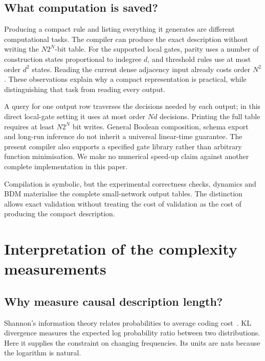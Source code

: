 \documentclass[11pt,a4paper]{article}
\begin{document}
\subsection{What computation is saved?}
Producing a compact rule and listing everything it generates are different
computational tasks. The compiler can produce the exact description without writing the
$N2^N$-bit table. For the supported local gates, parity uses a number of
construction states proportional to indegree $d$, and threshold rules use
at most order $d^2$ states. Reading the current dense adjacency input
already costs order $N^2$. These observations explain why a compact
representation is practical, while distinguishing that task from reading
every output.

A query for one output row traverses the decisions needed by each output;
in this direct local-gate setting it uses at most order $Nd$ decisions.
Printing the full table requires at least $N2^N$ bit writes. General Boolean
composition, schema export and long-run inference do not inherit a universal
linear-time guarantee. The present compiler also supports a specified gate
library rather than arbitrary function minimisation. We make no numerical
speed-up claim against another complete implementation in this paper.

Compilation is symbolic, but the experimental correctness checks, dynamics
and BDM materialise the complete small-network output tables. The distinction
allows exact validation without treating the cost of validation as the cost
of producing the compact description.

\section{Interpretation of the complexity measurements}\label{app:complexity-details}
\subsection{Why measure causal description length?}
Shannon's information theory relates probabilities to average coding
cost~\cite{shannon}. KL divergence measures the expected log probability
ratio between two distributions. Here it supplies the constraint on changing
frequencies. Its units are nats because the logarithm is natural.
\end{document}
